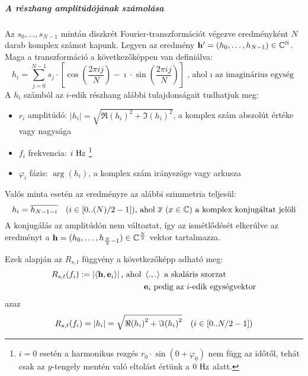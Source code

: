 \subparagraph{A r\'eszhang amplit\'ud\'oj\'anak sz\'amol\'asa}
Az $s_0,\dots,s_{N-1}$ mint\'an diszkr\'et Fourier-transzform\'aci\'ot v\'egezve eredm\'enyk\'ent $N$ darab komplex sz\'amot kapunk. Legyen az eredm\'eny $ \mathbf{h'}=(h_0,\dots,h_{N-1})\in\mathbb{C^N}$. \newline
Maga a transzform\'aci\'o a k\"ovetkez\H ok\'eppen van defini\'alva:
\[
h_i = \sum_{j=0}^{N-1} s_j \cdot \left[ \cos\left( \frac{2\pi i j}{N} \right) - \imath\cdot\sin\left( \frac{2\pi i j}{N} \right) \right] \text{, ahol $\imath$ az imagin\'arius egys\'eg}
\]
A $h_i$ sz\'amb\'ol az $i$-edik r\'eszhang al\'abbi tulajdons\'agait tudhatjuk meg:
\begin{itemize}
	\item $r_i$ amplit\'ud\'o: $|h_i|=\sqrt{\Re{(h_i)}^2 + \Im{(h_i)}^2}$, a komplex sz\'am abszol\'ut \'ert\'eke vagy nagys\'aga
	\item $f_i$ frekvencia: $i\ \mathrm{Hz}$ 
		\footnote{$i=0$ eset\'en a harmonikus rezg\'es $r_0\cdot\sin(0+\varphi_0)$ nem f\"ugg az id\H ot\H ol, teh\'at csak az $y$-tengely ment\'en val\'o eltol\'ast \'ert\"unk a $0\ \mathrm{Hz}$ alatt.}
	\item $\varphi_i$ f\'azis: $\arg (h_i)$, a komplex sz\'am ir\'anysz\"oge vagy arkusza
\end{itemize}

Val\'os minta eset\'en az eredm\'enyre az al\'abbi szimmetria teljes\"ul:
\[
h_i = \conj{h_{N-1-i}} \quad (i\in\left[0..\infrac{(N)}{2}-1\right])\text{, ahol $\conj{x}\ (x\in\mathbb C)$ a komplex konjug\'altat jel\"oli}
\]
A konjug\'al\'as az amplit\'ud\'on nem v\'altoztat, \'igy az ism\'etl\H od\'es\'et elker\'ulve az eredm\'enyt a $\mathbf{h}=(h_0,\dots,h_{\frac{N}{2}-1})\in\mathbb{C}^{\frac{N}{2}}$ vektor tartalmazza.

Ezek alapj\'an az $R_{s,t}$ f\"uggv\'eny a k\"ovetkez\H ok\'epp adhat\'o meg:
\[ \begin{aligned}
R_{s,t}(f_i):=\left| \left<\mathbf{h},\mathbf{e}_i\right> \right|
\text{, ahol}\  & \left<.,.\right>\text{ a skal\'aris szorzat} \\
& \mathbf{e}_i\text{ pedig az $i$-edik egys\'egvektor}
\end{aligned}
\]
azaz
\[ R_{s,t}(f_i) = |h_i| = \sqrt{\Re{(h_i)}^2 + \Im{(h_i)}^2}
\quad (i\in [0..N/2-1]) \]


